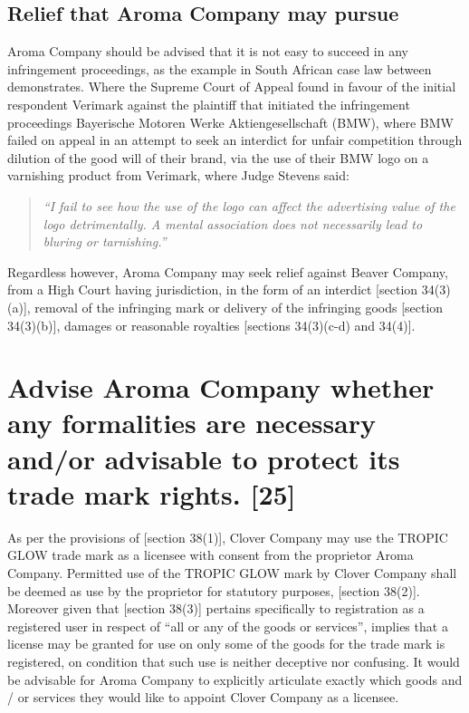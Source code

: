 \documentclass[11pt]{article}
\begin{document}
\subsection{Relief that Aroma Company may pursue}
\label{sec:org392c869}
Aroma Company should be advised that it is not easy to succeed in any infringement
proceedings, as the example in South African case law between
 \cite{harms07_verimark_v_bmw} demonstrates. Where
the Supreme Court of Appeal found in favour of the initial respondent Verimark
against the plaintiff that initiated the infringement proceedings Bayerische
Motoren Werke Aktiengesellschaft (BMW), where BMW failed on appeal in an attempt to seek
an interdict for unfair competition through dilution of the good will of their
brand, via the use of their BMW logo on a varnishing product from Verimark,
where Judge Stevens said:
\begin{quote}
\textit{``I fail to see how the use of the logo can affect the advertising value of the logo detrimentally. A mental association does not necessarily lead to bluring or tarnishing.''}
\end{quote}

Regardless however, Aroma Company may seek relief against Beaver Company, from a
High Court having jurisdiction, in the form of an interdict [section
34(3)(a)]\cite{rsa93_tm_act}, removal of the infringing mark or delivery of the
infringing goods [section 34(3)(b)]\cite{rsa93_tm_act}, damages or reasonable
royalties [sections 34(3)(c-d) and 34(4)]\cite{rsa93_tm_act}.

\section{Advise Aroma Company whether any formalities are necessary and/or advisable to protect its trade mark rights. [25]}
\label{sec:org359c643}

As per the provisions of [section 38(1)]\cite{rsa93_tm_act}, Clover Company may
use the TROPIC GLOW trade mark as a licensee with consent from the proprietor
Aroma Company. Permitted use of the TROPIC GLOW mark by Clover Company shall be
deemed as use by the proprietor for statutory purposes, [section
38(2)]\cite{rsa93_tm_act}. Moreover given that [section 38(3)]\cite{rsa93_tm_act}
pertains specifically to registration as a registered user in respect of ``all
or any of the goods or services'', implies that a license may be granted for use
on only some of the goods for the trade mark is registered, on condition that
such use is neither deceptive nor confusing. It would be advisable for Aroma
Company to explicitly articulate exactly which goods and / or services they
would like to appoint Clover Company as a licensee.\\
\end{document}
